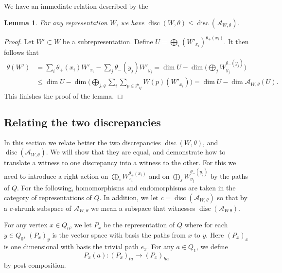 \documentclass[a4paper]{amsart}
\numberwithin{equation}{section}
\theoremstyle{plain}
\newtheorem{lemma}[theorem]{Lemma}
\theoremstyle{definition}
\DeclareMathOperator{\disc}{disc}
\begin{document}
We have an immediate relation described by the 
\begin{lemma}\label{rep_disc_bounded_by_mat_disc}
For any representation $W$, we have $\disc(W,\theta)\leq \disc(\mathcal{A}_{W,\theta})$. 
\end{lemma}

\begin{proof}
Let $W'\subset W$ be a subrepresentation. Define $U=\bigoplus_{i}(W'_{x_i})^{\theta_{+}(x_i)}$. It then follows that 
\begin{equation*}\begin{split}\theta(W')&=\sum_{i}\theta_{+}(x_i)W'_{x_i}-\sum_j\theta_{-}(y_j)W'_{y_j}=\dim U-\dim\big(\bigoplus_j W_{y_j}^{\theta_-(y_j)}\big)\\
&\leq \dim U-\dim\big(\bigoplus_{j,q}\sum_{i}\sum_{p\in \mathcal{P}_{ij}}W(p)(W'_{x_i})\big)=\dim U-\dim \mathcal{A}_{W,\theta}(U).\end{split}\end{equation*}
This finishes the proof of the lemma.
\end{proof}

\subsection{Relating the two discrepancies}
In this section we relate better the two discrepancies $\disc(W,\theta)$, and $\disc(\mathcal{A}_{W,\theta})$. We will show that they are equal, and demonstrate how to translate a witness to one discrepancy into a witness to the other. For this we need to introduce a right action on $\bigoplus_iW^{\theta_{+}(x_i)}_{x_i}$ and on $\bigoplus_{j}W_{y_j}^{\theta_{-}(y_j)}$ by the paths of $Q$. For the following, homomorphisms and endomorphisms are taken in the category of representations of $Q$. In addition, we let $c=\disc(\mathcal{A}_{W,\theta})$ so that by a $c$-shrunk subspace of $\mathcal{A}_{W,\theta}$ we mean a subspace that witnesses $\disc(\mathcal{A}_{W\,\theta})$.

For any vertex $x\in Q_0$, we let $P_x$ be the representation of $Q$ where for each $y\in Q_0$, $(P_x)_y$ is the vector space with basis the paths from $x$ to $y$. Here $(P_x)_x$ is one dimensional with basis the trivial path $e_x$. For any $a\in Q_1$, we define $$P_x(a):(P_x)_{ta}\rightarrow (P_x)_{ha}$$ by post composition. 
\end{document}
